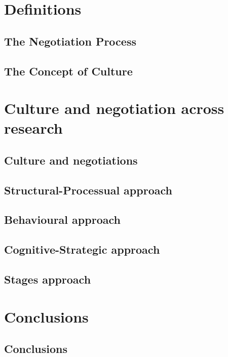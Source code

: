 \documentclass[12pt]{report}
\begin{document}
\part{Definitions}
\chapter{The Negotiation Process}


\chapter{The Concept of Culture}


\part{Culture and negotiation across research}
\chapter{Culture and negotiations}


\chapter{Structural-Processual approach}


\chapter{Behavioural approach}


\chapter{Cognitive-Strategic approach}


\chapter{Stages approach}


\part{Conclusions} %
\chapter{Conclusions}


%
\printbibliography[title={Bibliography}]
\end{document}
